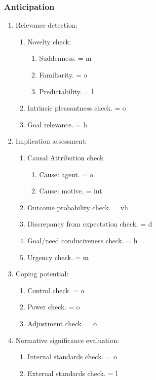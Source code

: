 \subsubsection{Anticipation}

\begin{enumerate}
 \item  Relevance detection:
 \begin{enumerate}
  \item  Novelty check:
  \begin{enumerate}
   \item  Suddenness. = m
   \item  Familiarity. = o
   \item  Predictability. = l
  \end{enumerate}
  \item  Intrinsic pleasantness check. = o
  \item  Goal relevance. = h
 \end{enumerate}
 \item  Implication assessment:
 \begin{enumerate}
  \item  Causal Attribution check
  \begin{enumerate}
   \item  Cause: agent. = o
   \item  Cause: motive. = int
  \end{enumerate}
  \item  Outcome probability check. = vh
  \item  Discrepancy from expectation check. = d
  \item  Goal/need conduciveness check. = h
  \item  Urgency check. = m
 \end{enumerate}
 \item  Coping potential:
 \begin{enumerate}
  \item  Control check. = o
  \item  Power check. = o
  \item  Adjustment check. = o
 \end{enumerate}
 \item  Normative significance evaluation:
 \begin{enumerate}
  \item  Internal standards check. = o
  \item  External standards check. = l
 \end{enumerate}
\end{enumerate}

